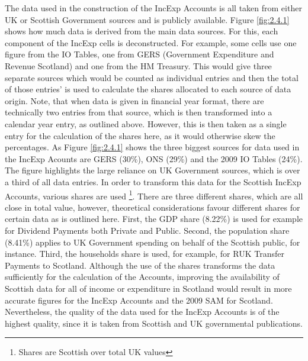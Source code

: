 The data used in the construction of the IncExp Accounts is all taken from either UK or Scottish Government sources and is publicly available. Figure \ref{fig:2.4.1} shows how much data is derived from the main data sources. For this, each component of the IncExp cells is deconstructed. For example, some cells use one figure from the IO Tables, one from GERS (Government Expenditure and Revenue Scotland) and one from the HM Treasury. This would give three separate sources which would be counted as individual entries and then the total of those entries' is used to calculate the shares allocated to each source of data origin. Note, that when data is given in financial year format, there are technically two entries from that source, which is then transformed into a calendar year entry, as outlined above. However, this is then taken as a single entry for the calculation of the shares here, as it would otherwise skew the percentages. As Figure \ref{fig:2.4.1} shows the three biggest sources for data used in the IncExp Acounts are GERS (30\%), ONS (29\%) and the 2009 IO Tables (24\%). The figure highlights the large reliance on UK Government sources, which is over a third of all data entries. In order to transform this data for the Scottish IncExp Accounts, various shares are used \footnote{Shares are Scottish over total UK values}. There are three different shares, which are all close in total value, however, theoretical considerations favour different shares for certain data as is outlined here. First, the GDP share (8.22\%) is used for example for Dividend Payments both Private and Public. Second, the population share (8.41\%) applies to UK Government spending on behalf of the Scottish public, for instance. Third, the households share is used, for example, for RUK Transfer Payments to Scotland. Although the use of the shares transforms the data sufficiently for the calculation of the Accounts, improving the availability of Scottish data for all of income or expenditure in Scotland would result in more accurate figures for the IncExp Accounts and the 2009 SAM for Scotland. Nevertheless, the quality of the data used for the IncExp Accounts is of the highest quality, since it is taken from Scottish and UK governmental publications. 


